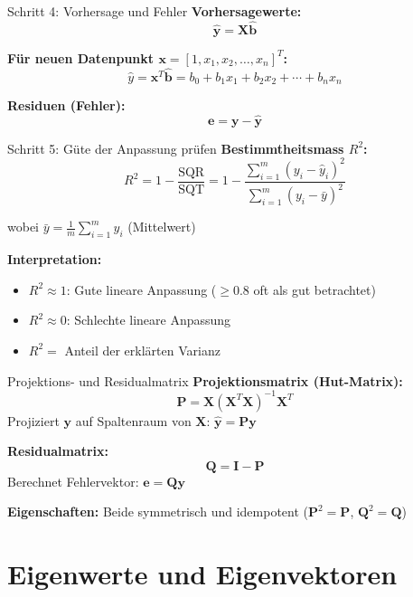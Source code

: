\documentclass[a4paper, fontsize=7pt]{scrartcl}
\begin{document}
\begin{mainbox}{Schritt 4: Vorhersage und Fehler}
\textbf{Vorhersagewerte:}
\[\hat{\mathbf{y}} = \mathbf{X}\hat{\mathbf{b}}\]

\textbf{Für neuen Datenpunkt $\mathbf{x} = [1, x_1, x_2, \ldots, x_n]^T$:}
\[\hat{y} = \mathbf{x}^T\hat{\mathbf{b}} = b_0 + b_1x_1 + b_2x_2 + \cdots + b_nx_n\]

\textbf{Residuen (Fehler):}
\[\mathbf{e} = \mathbf{y} - \hat{\mathbf{y}}\]
\end{mainbox}

\begin{mainbox}{Schritt 5: Güte der Anpassung prüfen}
\textbf{Bestimmtheitsmass $R^2$:}
\[R^2 = 1 - \frac{\text{SQR}}{\text{SQT}} = 1 - \frac{\sum_{i=1}^{m}(y_i - \hat{y}_i)^2}{\sum_{i=1}^{m}(y_i - \bar{y})^2}\]

wobei $\bar{y} = \frac{1}{m}\sum_{i=1}^{m} y_i$ (Mittelwert)

\textbf{Interpretation:}
\begin{itemize}
    \item $R^2 \approx 1$: Gute lineare Anpassung ($\geq 0.8$ oft als gut betrachtet)
    \item $R^2 \approx 0$: Schlechte lineare Anpassung
    \item $R^2 = $ Anteil der erklärten Varianz
\end{itemize}
\end{mainbox}

\begin{subbox}{Projektions- und Residualmatrix}
\textbf{Projektionsmatrix (Hut-Matrix):}
\[\mathbf{P} = \mathbf{X}(\mathbf{X}^T\mathbf{X})^{-1}\mathbf{X}^T\]
Projiziert $\mathbf{y}$ auf Spaltenraum von $\mathbf{X}$: $\hat{\mathbf{y}} = \mathbf{Py}$

\textbf{Residualmatrix:}
\[\mathbf{Q} = \mathbf{I} - \mathbf{P}\]
Berechnet Fehlervektor: $\mathbf{e} = \mathbf{Qy}$

\textbf{Eigenschaften:} Beide symmetrisch und idempotent ($\mathbf{P}^2 = \mathbf{P}$, $\mathbf{Q}^2 = \mathbf{Q}$)
\end{subbox}

\section{Eigenwerte und Eigenvektoren}
\end{document}
